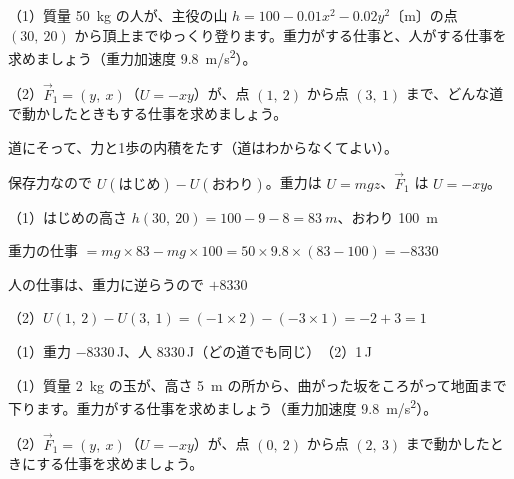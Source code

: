 \begin{reidai}[保存力の仕事]
（1）質量 \qty{50}{kg} の人が、主役の山 $h=100-0.01x^2-0.02y^2$〔m〕の点 $(30,\ 20)$ から頂上までゆっくり登ります。重力がする仕事と、人がする仕事を求めましょう（重力加速度 \qty{9.8}{m/s^2}）。\par
（2）$\vec F_1=(y,\ x)$（$U=-xy$）が、点 $(1,\ 2)$ から点 $(3,\ 1)$ まで、どんな道で動かしたときもする仕事を求めましょう。\par
\kangaekata {}\par
{}\enspace 道にそって、力と1歩の内積をたす（道はわからなくてよい）。\par
{}\enspace 保存力なので $U(\text{はじめ})-U(\text{おわり})$。重力は $U=mgz$、$\vec F_1$ は $U=-xy$。\par
\shiki\kviiihs{}\zw{} （1）はじめの高さ $h(30,\ 20)=100-9-8=\qty{83}{m}$、おわり \qty{100}{m}\par
\kviiihb 重力の仕事 $=mg\times83-mg\times100=50\times9.8\times(83-100)=-8330$\par
\kviiihb 人の仕事は、重力に逆らうので $+8330$\par
\kviiiha （2）$U(1,\ 2)-U(3,\ 1)=(-1\times2)-(-3\times1)=-2+3=1$\par
\kotae （1）重力 $-8330$\,J、人 8330\,J（どの道でも同じ）　（2）1\,J
\end{reidai}

\begin{jibun}
（1）質量 \qty{2}{kg} の玉が、高さ \qty{5}{m} の所から、曲がった坂をころがって地面まで下ります。重力がする仕事を求めましょう（重力加速度 \qty{9.8}{m/s^2}）。\par
（2）$\vec F_1=(y,\ x)$（$U=-xy$）が、点 $(0,\ 2)$ から点 $(2,\ 3)$ まで動かしたときにする仕事を求めましょう。
\end{jibun}

